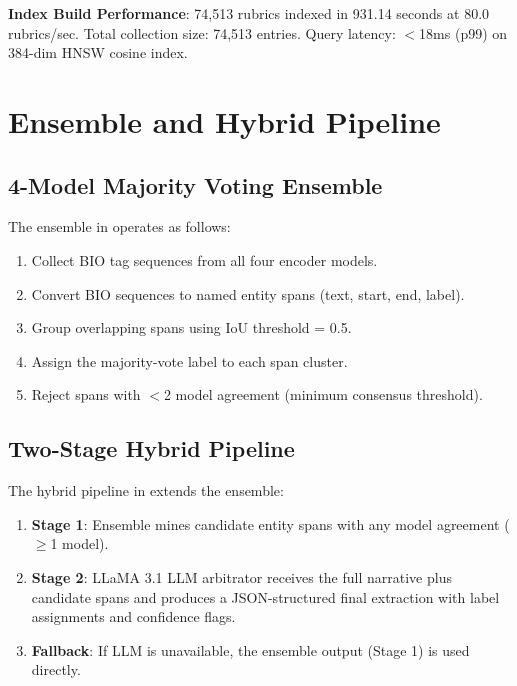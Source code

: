 \textbf{Index Build Performance}: 74,513 rubrics indexed in 931.14 seconds at 80.0 rubrics/sec. Total collection size: 74,513 entries. Query latency: $<$18ms (p99) on 384-dim HNSW cosine index.


\section{Ensemble and Hybrid Pipeline}

\subsection{4-Model Majority Voting Ensemble}

The ensemble in  operates as follows:
\begin{enumerate}
  \item Collect BIO tag sequences from all four encoder models.
  \item Convert BIO sequences to named entity spans (text, start, end, label).
  \item Group overlapping spans using IoU threshold = 0.5.
  \item Assign the majority-vote label to each span cluster.
  \item Reject spans with $<$2 model agreement (minimum consensus threshold).
\end{enumerate}

\subsection{Two-Stage Hybrid Pipeline}

The hybrid pipeline in  extends the ensemble:
\begin{enumerate}
  \item \textbf{Stage 1}: Ensemble mines candidate entity spans with any model agreement ($\geq$1 model).
  \item \textbf{Stage 2}: LLaMA 3.1 LLM arbitrator receives the full narrative plus candidate spans and produces a JSON-structured final extraction with label assignments and confidence flags.
  \item \textbf{Fallback}: If LLM is unavailable, the ensemble output (Stage 1) is used directly.
\end{enumerate}


